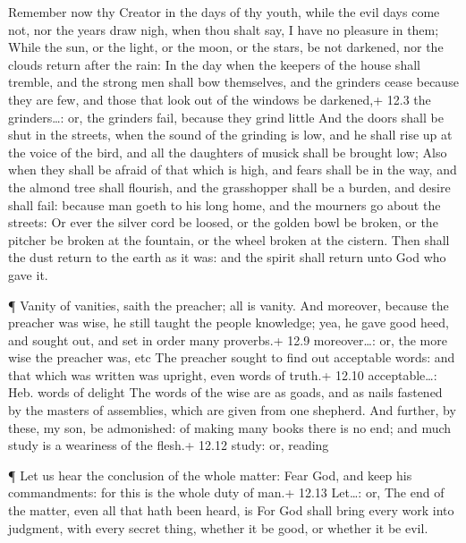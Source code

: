  Remember now thy Creator in the days of thy youth, while
the evil days come not, nor the years draw nigh, when thou shalt say, I
have no pleasure in them;  While the sun, or the light, or
the moon, or the stars, be not darkened, nor the clouds return after the
rain:  In the day when the keepers of the house shall
tremble, and the strong men shall bow themselves, and the grinders cease
because they are few, and those that look out of the windows be
darkened,+ 12.3 the grinders\ldots: or, the grinders fail, because they
grind little  And the doors shall be shut in the streets,
when the sound of the grinding is low, and he shall rise up at the voice
of the bird, and all the daughters of musick shall be brought low;
 Also when they shall be afraid of that which is high, and
fears shall be in the way, and the almond tree shall flourish, and the
grasshopper shall be a burden, and desire shall fail: because man goeth
to his long home, and the mourners go about the streets:  Or
ever the silver cord be loosed, or the golden bowl be broken, or the
pitcher be broken at the fountain, or the wheel broken at the cistern.
 Then shall the dust return to the earth as it was: and the
spirit shall return unto God who gave it.

 ¶ Vanity of vanities, saith the preacher; all is vanity.
 And moreover, because the preacher was wise, he still
taught the people knowledge; yea, he gave good heed, and sought out, and
set in order many proverbs.+ 12.9 moreover\ldots: or, the more wise the
preacher was, etc  The preacher sought to find out
acceptable words: and that which was written was upright, even words of
truth.+ 12.10 acceptable\ldots: Heb. words of delight  The
words of the wise are as goads, and as nails fastened by the masters of
assemblies, which are given from one shepherd.  And
further, by these, my son, be admonished: of making many books there is
no end; and much study is a weariness of the flesh.+ 12.12 study: or,
reading

 ¶ Let us hear the conclusion of the whole matter: Fear
God, and keep his commandments: for this is the whole duty of man.+
12.13 Let\ldots: or, The end of the matter, even all that hath been
heard, is  For God shall bring every work into judgment,
with every secret thing, whether it be good, or whether it be evil.
